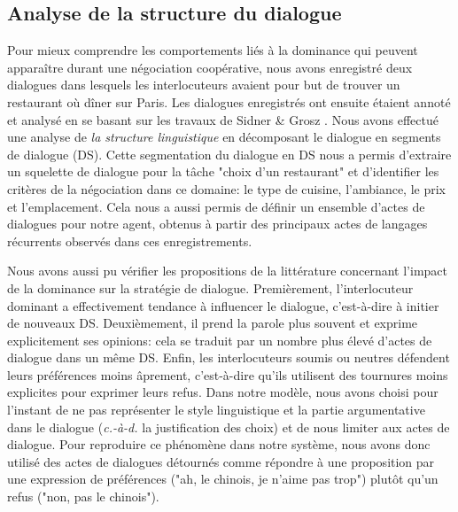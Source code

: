 \documentclass [french]{sig-alternate-05-2015}
\begin{document}
\subsection{Analyse de la structure du dialogue}

Pour mieux comprendre les comportements liés à la dominance qui peuvent apparaître durant une négociation coopérative, nous avons enregistré deux dialogues dans lesquels les interlocuteurs avaient pour but de trouver un restaurant où dîner sur Paris. Les dialogues enregistrés ont ensuite étaient annoté et analysé en se basant sur les travaux de Sidner \& Grosz \cite{grosz1986attention}. Nous avons effectué une analyse de \textit{la structure linguistique}  en décomposant le dialogue en segments de dialogue (DS). Cette segmentation du dialogue en DS nous a permis d'extraire un squelette de dialogue pour la tâche "choix d'un restaurant" et d'identifier les critères de la négociation dans ce domaine: le type de cuisine, l'ambiance, le prix et l'emplacement. Cela nous a aussi permis de définir un ensemble d'actes de dialogues pour notre agent, obtenus à partir des principaux actes de langages récurrents observés dans ces enregistrements.

Nous avons aussi pu vérifier les propositions de la littérature concernant l'impact de la dominance sur la stratégie de dialogue. Premièrement, l'interlocuteur dominant a effectivement tendance à influencer le dialogue, c'est-à-dire à initier de nouveaux DS. Deuxièmement, il prend la parole plus souvent et exprime explicitement ses opinions: cela se traduit par un nombre plus élevé d'actes de dialogue dans un même DS. Enfin, les interlocuteurs soumis ou neutres défendent leurs préférences moins âprement, c'est-à-dire qu'ils utilisent des tournures moins explicites pour exprimer leurs refus. Dans notre modèle, nous avons choisi pour l'instant de ne pas représenter le style linguistique et la partie argumentative dans le dialogue (\emph{c.-à-d.} la justification des choix) et de nous limiter aux actes de dialogue. Pour reproduire ce phénomène dans notre système, nous avons donc utilisé des actes de dialogues détournés comme répondre à une proposition par une expression de préférences ("ah, le chinois, je n'aime pas trop") plutôt qu'un refus ("non, pas le chinois").
\end{document}
